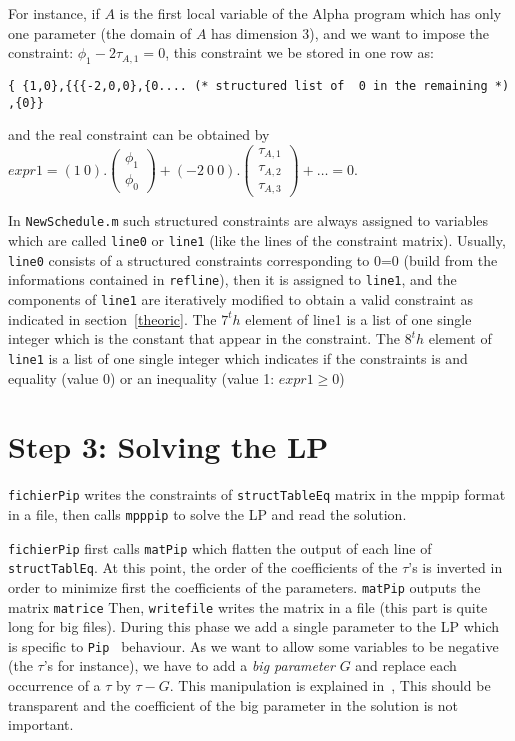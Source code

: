 For instance, if $A$ is the first local 
variable of the Alpha program which has only one parameter 
 (the domain of $A$ has dimension 3),
 and we want to impose the constraint: 
$\phi_1 - 2\tau_{A,1} = 0 $, this constraint we be stored in one row as:
\begin{verbatim}
{ {1,0},{{{-2,0,0},{0.... (* structured list of  0 in the remaining *) ,{0}}
\end{verbatim}
and the real constraint can be obtained by 
$expr1 = (1\ 0).\left(\begin{array}{c} \phi_1 \\ \phi_0 \end{array}\right)+
 (-2\ 0 \ 0).\left(\begin{array}{c} \tau_{A,1} \\ 
\tau_{A,2} \\ \tau_{A,3}  \end{array}\right)+ \ldots  = 0 $.

In {\tt NewSchedule.m}  such structured  constraints are always assigned to 
variables which are called {\tt line0} or {\tt line1} (like the lines of the 
constraint matrix). Usually, {\tt line0} consists of a structured constraints
corresponding to 0=0 (build from the informations contained in {\tt refline}),
 then it is assigned to {\tt line1}, and
 the  components of {\tt line1} are iteratively modified to obtain a 
valid constraint as indicated in section~\ref{theoric}.
 The $7^th$  element of  line1 is a list of one single integer
which is the constant that appear in the constraint. The $8^th$  
 element of  {\tt line1} is a list of one single integer which indicates if the constraints is and equality (value 0) or an inequality (value 1: $expr1 \geq 0$)
 

\section{Step 3: Solving the LP}

{\tt fichierPip}  writes the constraints of 
{\tt structTableEq} matrix in the mppip format in a file, 
then calls {\tt mpppip} to solve the LP and read the solution.

{\tt fichierPip} first calls {\tt matPip} which flatten the output of
each line of {\tt structTablEq}. At this point, the order of the coefficients 
of the $\tau$'s is inverted in order to minimize first the coefficients 
of the parameters. {\tt matPip} outputs the matrix {\tt matrice} 
 Then, {\tt writefile} writes the matrix in a file (this part is
quite long for big files). During this phase we add a single parameter
to the LP which is specific to {\tt Pip } behaviour. As we want to allow some 
variables to be negative (the $\tau$'s for instance), we have to add a 
{\em big parameter} $G$ and replace each occurrence of a $\tau$ by $\tau-G$. 
This manipulation is explained in~\cite{Feautrier88a}, This should be transparent 
and the coefficient of the big parameter in the solution is not important.
 
